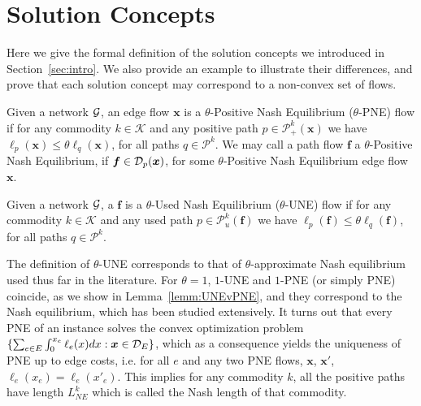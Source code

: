 \section{Solution Concepts}\label{sec:satisfaction} 
Here we give the formal definition of the solution concepts we introduced in Section~\ref{sec:intro}.  We also provide an example to illustrate their differences, and prove that each solution concept may correspond to a non-convex set of flows. %

\begin{definition}\label{def:ApproxPNE}
Given a network $\mathcal{G}$, an edge flow $\bm{x}$ is a $\theta$-Positive Nash Equilibrium ($\theta$-PNE) flow if for any commodity $k\in \mathcal{K}$ and any positive path $p\in \mathcal{P}_{+}^k(\bm{x})$ we have $\ell_p(\bm{x}) \leq \theta \ell_q(\bm{x})$, for all paths $q\in \mathcal{P}^k$. 
We may call a path flow $\bm{f}$  a $\theta$-Positive Nash Equilibrium, if $\bm{f}\in \mathcal{D}_p(\bm{x})$, for some $\theta$-Positive Nash Equilibrium edge flow $\bm{x}$.
\end{definition}

\begin{definition}\label{def:ApproxUNE}
Given a network $\mathcal{G}$, a {\pathdecomp} $\bm{f}$ is a $\theta$-Used Nash Equilibrium ($\theta$-UNE) flow if for any commodity $k\in \mathcal{K}$ and any used path $p\in \mathcal{P}_{u}^k(\bm{f})$ we have $\ell_p(\bm{f}) \leq \theta \ell_q(\bm{f})$, for all paths $q\in \mathcal{P}^k$. %
\end{definition}

The definition of $\theta$-UNE  corresponds to that of $\theta$-approximate Nash equilibrium used thus far in the literature.
For $\theta=1$, $1$-UNE and $1$-PNE (or simply PNE) coincide, as we show in Lemma~\ref{lemm:UNEvPNE}, and they correspond to the Nash equilibrium, which has been studied extensively. %
It turns out that every PNE of an instance solves the convex optimization problem  
$\{ \sum_{e\in E}\int_{0}^{x_e} \ell_e(x)dx : \bm{x}\in \mathcal{D}_E\}$,
which as a consequence yields the uniqueness of PNE up to edge costs, i.e. for all $e$ and any two PNE flows, $\bm{x}$, $\bm{x}'$, $\ell_e(x_e)=\ell_e(x'_e)$. This implies for any commodity $k$, all the positive paths have length $L^k_{NE}$ which is called the Nash length of that commodity.   

